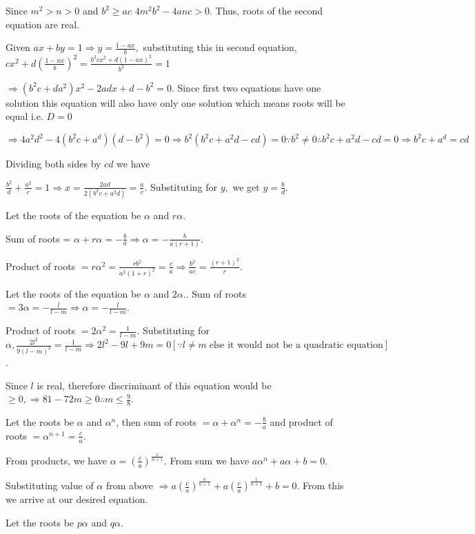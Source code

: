  Since $m^2 > n > 0$ and $b^2 \geq ac$ $4m^2b^2 - 4anc > 0$. Thus, roots of the second equation are real.
\item Given $ax + by = 1 \Rightarrow y = \frac{1 - ax}{b},$ substituting this in second equation, $cx^2 +
  d\left(\frac{1 - ax}{b}\right)^2 = \frac{b^2cx^2 + d(1 - ax)^2}{b^2} = 1$

  $\Rightarrow (b^2c + da^2)x^2 - 2adx + d - b^2 = 0$. Since first two equations have one solution this
  equation will also have only one solution which means roots will be equal i.e. $D = 0$

  $\Rightarrow 4a^2d^2 - 4(b^2c + a^d)(d - b^2) = 0\Rightarrow b^2(b^2c + a^2d - cd) = 0\because b^2 \ne 0
  \therefore b^2c + a^2d - cd = 0 \Rightarrow b^2c + a^d = cd$

  Dividing both sides by $cd$ we have

  $\frac{b^2}{d} + \frac{a^2}{c} = 1\Rightarrow x = \frac{2ad}{2(b^2c + a^2d)} = \frac{a}{c}$. Substituting
  for $y,$ we get $y = \frac{b}{d}$.
\item Let the roots of the equation be $\alpha$ and $r\alpha$.

  Sum of roots = $\alpha + r\alpha = -\frac{b}{a} \Rightarrow \alpha = -\frac{b}{a(r + 1)}$.

  Product of roots $= r\alpha^2 = \frac{rb^2}{a^2(1 + r)^2} = \frac{c}{a} \Rightarrow \frac{b^2}{ac} =
  \frac{(r + 1)^2}{r}$.
\item Let the roots of the equation be $\alpha$ and $2\alpha.$. Sum of roots $= 3\alpha = -\frac{l}{l - m}
  \Rightarrow \alpha = -\frac{l}{l - m}$.

  Product of roots $= 2\alpha^2 = \frac{1}{l - m}$. Substituting for $\alpha, \frac{2l^2}{9(l - m)^2} =
  \frac{1}{l - m} \Rightarrow 2l^2- 9l + 9m = 0 [\because l\neq m\;\text{else it would not be a quadratic
      equation}]$.

  Since $l$ is real, therefore discriminant of this equation would be $\geq 0, \Rightarrow 81 - 72m \geq 0
  \therefore m \leq \frac{9}{8}$.
\item Let the roots be $\alpha$ and $\alpha^n$, then sum of roots $= \alpha + \alpha^n = -\frac{b}{a}$ and
  product of roots $= \alpha^{n + 1} = \frac{c}{a}$.

  From products, we have $\alpha = \left(\frac{c}{a}\right)^{\frac{1}{n + 1}}$. From sum we have $a\alpha^n + a\alpha + b = 0$.

  Substituting value of $\alpha$ from above $\Rightarrow a\left(\frac{c}{a}\right)^{\frac{n}{n + 1}} +
  a\left(\frac{c}{a}\right)^{\frac{1}{n + 1}} + b = 0$.  From this we arrive at our desired equation.
\item Let the roots be $p\alpha$ and $q\alpha$.

